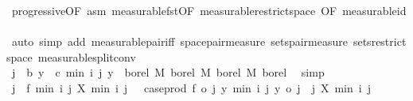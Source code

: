 \begin{isabellebody}
\ progressive{\isacharbrackleft}{\kern0pt}OF\ asm{\isacharbrackright}{\kern0pt}\ measurable{\isacharunderscore}{\kern0pt}fst{\isacharprime}{\kern0pt}{\isacharprime}{\kern0pt}{\isacharbrackleft}{\kern0pt}OF\ measurable{\isacharunderscore}{\kern0pt}restrict{\isacharunderscore}{\kern0pt}space{}{\isacharcomma}{\kern0pt}\ OF\ measurable{\isacharunderscore}{\kern0pt}id{\isacharbrackright}{\kern0pt}\ \isamarkupfalse%
\ {\isacharparenleft}{\kern0pt}auto\ simp\ add{\isacharcolon}{\kern0pt}\ measurable{\isacharunderscore}{\kern0pt}pair{\isacharunderscore}{\kern0pt}iff\ space{\isacharunderscore}{\kern0pt}pair{\isacharunderscore}{\kern0pt}measure\ sets{\isacharunderscore}{\kern0pt}pair{\isacharunderscore}{\kern0pt}measure\ sets{\isacharunderscore}{\kern0pt}restrict{\isacharunderscore}{\kern0pt}space\ measurable{\isacharunderscore}{\kern0pt}split{\isacharunderscore}{\kern0pt}conv{\isacharparenright}{\kern0pt}\isanewline
\ \ \isamarkupfalse%
\ \isamarkupfalse%
\ {\isachardoublequoteopen}{\isacharparenleft}{\kern0pt}{\isasymlambda}{\isacharparenleft}{\kern0pt}j\ {\isacharcolon}{\kern0pt}{\isacharcolon}{\kern0pt}\ {\isacharprime}{\kern0pt}b{\isacharcomma}{\kern0pt}\ y\ {\isacharcolon}{\kern0pt}{\isacharcolon}{\kern0pt}\ {\isacharprime}{\kern0pt}c{\isacharparenright}{\kern0pt}{\isachardot}{\kern0pt}\ {\isacharparenleft}{\kern0pt}{\isacharparenleft}{\kern0pt}min\ i\ j{\isacharparenright}{\kern0pt}{\isacharcomma}{\kern0pt}\ y{\isacharparenright}{\kern0pt}{\isacharparenright}{\kern0pt}\ {\isasymin}\ borel\ {\isasymOtimes}\isactrlsub M\ borel\ {\isasymrightarrow}\isactrlsub M\ borel\ {\isasymOtimes}\isactrlsub M\ borel{\isachardoublequoteclose}\ \isamarkupfalse%
\ simp\isanewline
\ \ \isamarkupfalse%
\ \isamarkupfalse%
\ {\isachardoublequoteopen}{\isacharparenleft}{\kern0pt}{\isasymlambda}{\isacharparenleft}{\kern0pt}j{\isacharcomma}{\kern0pt}\ {\isasymxi}{\isacharparenright}{\kern0pt}{\isachardot}{\kern0pt}\ f\ {\isacharparenleft}{\kern0pt}min\ i\ j{\isacharparenright}{\kern0pt}\ {\isacharparenleft}{\kern0pt}X\ {\isacharparenleft}{\kern0pt}min\ i\ j{\isacharparenright}{\kern0pt}\ {\isasymxi}{\isacharparenright}{\kern0pt}{\isacharparenright}{\kern0pt}\ {\isacharequal}{\kern0pt}\ case{\isacharunderscore}{\kern0pt}prod\ f\ o\ {\isacharparenleft}{\kern0pt}{\isacharparenleft}{\kern0pt}{\isasymlambda}{\isacharparenleft}{\kern0pt}j{\isacharcomma}{\kern0pt}\ y{\isacharparenright}{\kern0pt}{\isachardot}{\kern0pt}\ {\isacharparenleft}{\kern0pt}{\isacharparenleft}{\kern0pt}min\ i\ j{\isacharparenright}{\kern0pt}{\isacharcomma}{\kern0pt}\ y{\isacharparenright}{\kern0pt}{\isacharparenright}{\kern0pt}\ o\ {\isacharparenleft}{\kern0pt}{\isasymlambda}{\isacharparenleft}{\kern0pt}j{\isacharcomma}{\kern0pt}\ {\isasymxi}{\isacharparenright}{\kern0pt}{\isachardot}{\kern0pt}\ {\isacharparenleft}{\kern0pt}j{\isacharcomma}{\kern0pt}\ X\ {\isacharparenleft}{\kern0pt}min\ i\ j{\isacharparenright}{\kern0pt}\ {\isasymxi}{\isacharparenright}{\kern0pt}{\isacharparenright}{\kern0pt}{\isacharparenright}{\kern0pt}{\isachardoublequoteclose}\ \isamarkupfalse%

\end{isabellebody}
